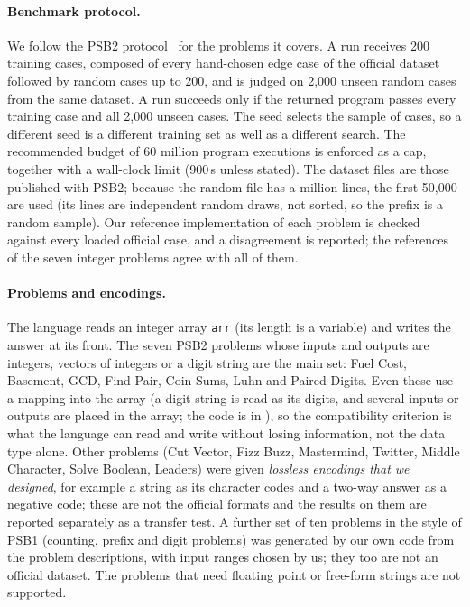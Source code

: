 \documentclass[sigconf,nonacm]{acmart}
\begin{document}
\paragraph{Benchmark protocol.}
We follow the PSB2 protocol~\cite{helmuth2021psb2} for the problems it covers. A run receives 200 training cases, composed of every
hand-chosen edge case of the official dataset followed by random cases up to 200, and is judged on 2,000 unseen random cases from
the same dataset. A run succeeds only if the returned program passes every training case and all 2,000 unseen cases. The seed
selects the sample of cases, so a different seed is a different training set as well as a different search. The recommended budget of 60 million program
executions is enforced as a cap, together with a wall-clock limit (900\,s unless stated). The dataset files are those published with
PSB2; because the random file has a million lines, the first 50,000 are used (its lines are independent random draws, not sorted, so the prefix is a random sample). Our reference implementation of each problem is checked against
every loaded official case, and a disagreement is reported; the references of the seven integer problems agree with all of them.

\paragraph{Problems and encodings.}
The language reads an integer array \texttt{arr} (its length is a variable) and writes the answer at its front. The seven PSB2 problems
whose inputs and outputs are integers, vectors of integers or a digit string are the main set: Fuel Cost, Basement, GCD, Find Pair, Coin Sums, Luhn and Paired
Digits. Even these use a mapping into the array (a digit string is read as its digits, and several inputs or outputs are placed in the array; the code is in ), so the compatibility criterion is what the language can read and write without losing information, not the data type alone. Other problems (Cut Vector, Fizz Buzz, Mastermind, Twitter, Middle Character, Solve Boolean, Leaders) were given
\emph{lossless encodings that we designed}, for example a string as its character codes and a two-way answer as a negative code; these are
not the official formats and the results on them are reported separately as a transfer test. A further set of ten problems in the style of
PSB1 (counting, prefix and digit problems) was generated by our own code from the problem descriptions, with input ranges chosen by us;
they too are not an official dataset. The problems that need floating point or free-form strings are not supported.
\end{document}
